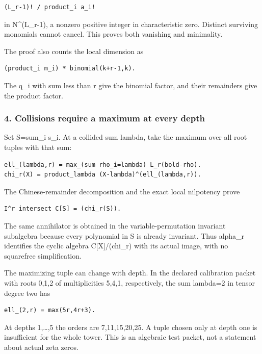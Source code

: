 \begin{verbatim}
(L_r-1)! / product_i a_i!
\end{verbatim}

in N\^{}(L\_r-1), a nonzero positive integer in characteristic zero. Distinct surviving monomials
cannot cancel. This proves both vanishing and minimality.

The proof also counts the local dimension as

\begin{verbatim}
(product_i m_i) * binomial(k+r-1,k).
\end{verbatim}

The q\_i with sum less than r give the binomial factor, and their remainders give the product
factor.

\subsubsection{4. Collisions require a maximum at every
depth}\label{conormal_cyclic_pr21:collisions-require-a-maximum-at-every-depth}

Set S=sum\_i s\_i. At a collided sum lambda, take the maximum over all root tuples with that sum:

\begin{verbatim}
ell_(lambda,r) = max_(sum rho_i=lambda) L_r(bold-rho).
chi_r(X) = product_lambda (X-lambda)^(ell_(lambda,r)).
\end{verbatim}

The Chinese-remainder decomposition and the exact local nilpotency prove

\begin{verbatim}
I^r intersect C[S] = (chi_r(S)).
\end{verbatim}

The same annihilator is obtained in the variable-permutation invariant subalgebra because every
polynomial in S is already invariant. Thus alpha\_r identifies the cyclic algebra C{[}X{]}/(chi\_r)
with its actual image, with no squarefree simplification.

The maximizing tuple can change with depth. In the declared calibration packet with roots 0,1,2 of
multiplicities 5,4,1, respectively, the sum lambda=2 in tensor degree two has

\begin{verbatim}
ell_(2,r) = max(5r,4r+3).
\end{verbatim}

At depths 1,\ldots,5 the orders are 7,11,15,20,25. A tuple chosen only at depth one is insufficient
for the whole tower. This is an algebraic test packet, not a statement about actual zeta zeros.

